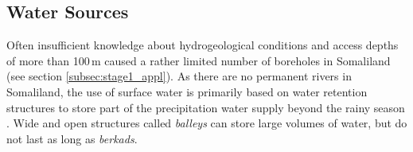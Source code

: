 \subsection{Water Sources}\label{subsec:water_sources}

Often insufficient knowledge about hydrogeological conditions and access depths of more than 100\,m caused a rather limited number of boreholes in Somaliland (see section \ref{subsec:stage1_appl})\autocite{faoswalimHydrogeologicalSurveyAssessment2012, petrucciLandscapeLandformsNorthern2022, salemTerritorialDiagnosticReport2016}. As there are no permanent rivers in Somaliland, the use of surface water is primarily based on water retention structures to store part of the precipitation water supply beyond the rainy season \autocite{petrucciLandscapeLandformsNorthern2022}. Wide and open structures called \textit{balleys} can store large volumes of water, but do not last as long as \textit{berkads}.\newline %
